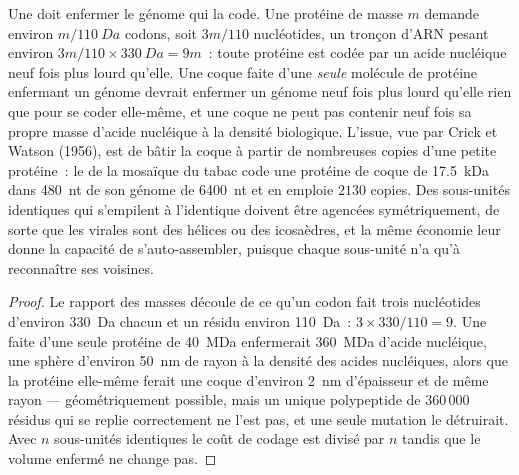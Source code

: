\begin{proposition}\label{prop:b3:virology:economy}
Une  doit enfermer le génome qui la code. Une protéine de masse
$m$ demande environ $m/\qty{110}{Da}$ codons, soit $3m/110$
nucléotides, un tronçon d'ARN pesant environ
$3m/110\times\qty{330}{Da} = 9m$~: toute protéine est codée par un
acide nucléique neuf fois plus lourd qu'elle. Une coque faite d'une
\emph{seule} molécule de protéine enfermant un génome devrait enfermer
un génome neuf fois plus lourd qu'elle rien que pour se coder
elle-même, et une coque ne peut pas contenir neuf fois sa propre masse
d'acide nucléique à la densité biologique. L'issue, vue par Crick et
Watson (1956), est de bâtir la coque à partir de nombreuses copies
d'une petite protéine~: le  de la mosaïque du tabac code une
protéine de coque de \qty{17.5}{kDa} dans \qty{480}{nt} de son génome
de \qty{6400}{nt} et en emploie $2130$ copies. Des sous-unités
identiques qui s'empilent à l'identique doivent être agencées
symétriquement, de sorte que les  virales sont des hélices ou
des icosaèdres, et la même économie leur donne la capacité de
s'auto-assembler, puisque chaque sous-unité n'a qu'à reconnaître ses
voisines.
\end{proposition}
\begin{proof}
Le rapport des masses découle de ce qu'un codon fait trois nucléotides
d'environ \qty{330}{Da} chacun et un résidu environ \qty{110}{Da}~:
$3\times 330/110 =
9$. Une  faite d'une seule protéine de \qty{40}{MDa}
enfermerait \qty{360}{MDa} d'acide nucléique, une sphère d'environ
\qty{50}{nm} de rayon à la densité des acides nucléiques, alors que la
protéine elle-même ferait une coque d'environ \qty{2}{nm} d'épaisseur
et de même rayon --- géométriquement possible, mais un unique
polypeptide de $360\,000$ résidus qui se replie correctement ne l'est
pas, et une seule mutation le détruirait. Avec $n$ sous-unités
identiques le coût de codage est divisé par $n$ tandis que le volume
enfermé ne change pas.
\end{proof}

